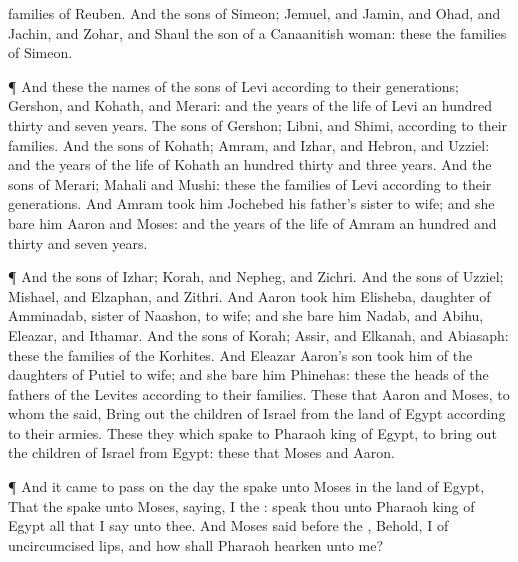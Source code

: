 {families of
Reuben.
And the
sons of
Simeon;
Jemuel, and
Jamin, and
Ohad, and
Jachin, and
Zohar, and
Shaul the
son of a Canaanitish
woman: these
{} the
families of
Simeon.
\par }{\PP {}¶ And these
{} the
names of the
sons of
Levi according to their
generations;
Gershon, and
Kohath, and
Merari: and the
years of the
life of
Levi
{} an
hundred
thirty and
seven
years.
The
sons of
Gershon;
Libni, and
Shimi, according to their
families.
And the
sons of
Kohath;
Amram, and
Izhar, and
Hebron, and
Uzziel: and the
years of the
life of
Kohath
{} an
hundred
thirty and
three
years.
And the
sons of
Merari;
Mahali and
Mushi: these
{} the
families of
Levi according to their
generations.
And
Amram
took him
Jochebed his
father’s sister to
wife; and she
bare him
Aaron and
Moses: and the
years of the
life of
Amram
{} an
hundred and
thirty and
seven
years.
\par }{\PP {}¶ And the
sons of
Izhar;
Korah, and
Nepheg, and
Zichri.
And the
sons of
Uzziel;
Mishael, and
Elzaphan, and
Zithri.
And
Aaron
took him
Elisheba,
daughter of
Amminadab,
sister of
Naashon, to
wife; and she
bare him
Nadab, and
Abihu,
Eleazar, and
Ithamar.
And the
sons of
Korah;
Assir, and
Elkanah, and
Abiasaph: these
{} the
families of the
Korhites.
And
Eleazar
Aaron’s
son
took him
{} of the
daughters of
Putiel to
wife; and she
bare him
Phinehas: these
{} the
heads of the
fathers of the
Levites according to their
families.
These
{} that
Aaron and
Moses, to
whom the
{}
said, Bring
out the
children of
Israel from the
land of
Egypt according to their
armies.
These
{} they which
spake to
Pharaoh
king of
Egypt, to bring
out the
children of
Israel from
Egypt: these
{} that
Moses and
Aaron.
\par }{\PP {}¶ And it came to pass on the
day
{} the
{}
spake unto
Moses in the
land of
Egypt,
That the
{}
spake unto
Moses,
saying, I
{} the
{}:
speak thou unto
Pharaoh
king of
Egypt all that I
say unto thee.
And
Moses
said
before the
{}, Behold, I
{} of
uncircumcised
lips, and how shall
Pharaoh
hearken unto me?

}
